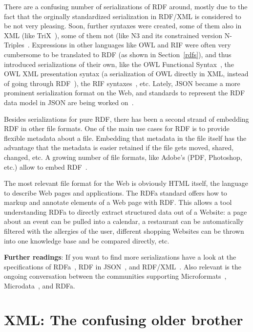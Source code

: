 \documentclass{IOS-Book-Article}
\begin{document}
There are a confusing number of serializations of RDF around, mostly due to the fact that the orginally standardized serialization in RDF/XML is considered to be not very pleasing.
Soon, further syntaxes were created, some of them also in XML (like TriX~\cite{trix}), some of them not (like N3 and its constrained version N-Triples~\cite{ntriples}.
Expressions in other languages like OWL and RIF were often very cumbersome to be translated to RDF (as shown in Section~\ref{rdfs}), and thus introduced serializations of their own, like the OWL Functional Syntax~\cite{owl2}, the OWL XML presentation syntax (a serialization of OWL directly in XML, instead of going through RDF~\cite{owl3}), the RIF syntaxes~\cite{rif}, etc.
Lately, JSON became a more prominent serialization format on the Web, and standards to represent the RDF data model in JSON are being worked on~\cite{json-ld}.

Besides serializations for pure RDF, there has been a second strand of embedding RDF in other file formats.
One of the main use cases for RDF is to provide flexible metadata about a file.
Embedding that metadata in the file itself has the advantage that the metadata is easier retained if the file gets moved, shared, changed, etc.
A growing number of file formats, like Adobe's (PDF, Photoshop, etc.) allow to embed RDF~\cite{xmp}.

The most relevant file format for the Web is obviously HTML itself, the language to describe Web pages and applications.
The RDFa standard offers how to markup and annotate elements of a Web page with RDF.
This allows a tool understanding RDFa to directly extract structured data out of a Website:
a page about an event can be pulled into a calendar,
a restaurant can be automatically filtered with the allergies of the user,
different shopping Websites can be thrown into one knowledge base and be compared directly, etc.

\medskip

\textbf{Further readings}:
If you want to find more serializations have a look at the specifications of RDFa~\cite{rdfa}, RDF in JSON~\cite{json-ld}, and RDF/XML~\cite{rdfxml}.
Also relevant is the ongoing conversation between the communities supporting Microformats~\cite{microformats}, Microdata~\cite{microdata}, and RDFa.

\section{XML: The confusing older brother}
\label{xml}
\end{document}
